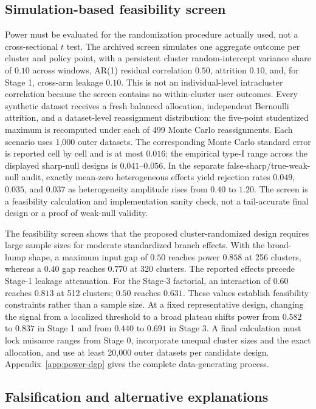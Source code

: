 \documentclass[10pt,a4paper]{article}
\begin{document}
\subsection{Simulation-based feasibility screen}

Power must be evaluated for the randomization procedure actually used, not a cross-sectional $t$ test. The archived screen simulates one aggregate outcome per cluster and policy point, with a persistent cluster random-intercept variance share of $0.10$ across windows, AR(1) residual correlation $0.50$, attrition $0.10$, and, for Stage 1, cross-arm leakage $0.10$. This is not an individual-level intracluster correlation because the screen contains no within-cluster user outcomes. Every synthetic dataset receives a fresh balanced allocation, independent Bernoulli attrition, and a dataset-level reassignment distribution: the five-point studentized maximum is recomputed under each of 499 Monte Carlo reassignments. Each scenario uses 1,000 outer datasets. The corresponding Monte Carlo standard error is reported cell by cell and is at most $0.016$; the empirical type-I range across the displayed sharp-null designs is $0.041$--$0.056$. In the separate false-sharp/true-weak-null audit, exactly mean-zero heterogeneous effects yield rejection rates $0.049$, $0.035$, and $0.037$ as heterogeneity amplitude rises from $0.40$ to $1.20$. The screen is a feasibility calculation and implementation sanity check, not a tail-accurate final design or a proof of weak-null validity.

The feasibility screen shows that the proposed cluster-randomized design requires large sample sizes for moderate standardized branch effects. With the broad-hump shape, a maximum input gap of $0.50$ reaches power $0.858$ at 256 clusters, whereas a $0.40$ gap reaches $0.770$ at 320 clusters. The reported effects precede Stage-1 leakage attenuation. For the Stage-3 factorial, an interaction of $0.60$ reaches $0.813$ at 512 clusters; $0.50$ reaches $0.631$. These values establish feasibility constraints rather than a sample size. At a fixed representative design, changing the signal from a localized threshold to a broad plateau shifts power from $0.582$ to $0.837$ in Stage 1 and from $0.440$ to $0.691$ in Stage 3. A final calculation must lock nuisance ranges from Stage 0, incorporate unequal cluster sizes and the exact allocation, and use at least 20,000 outer datasets per candidate design. Appendix~\ref{app:power-dgp} gives the complete data-generating process.

\subsection{Falsification and alternative explanations}
\end{document}
